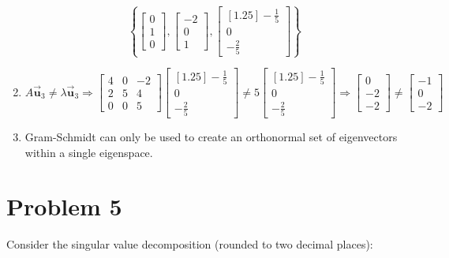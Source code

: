 \documentclass[letter,11pt]{article}
\theoremstyle{definition}
\newcommand{\uvec}{\vec{\boldsymbol{u}}}
\begin{document}
\begin{tcolorbox}[boxrule=1mm,enhanced jigsaw, breakable,before=\hfill,after=\hfill,adjusted title={Problem 4 solutions}]
\begin{enumerate}[label = \alph*.)]
            $$\left\{\begin{bmatrix}0\\ 1\\ 0 \end{bmatrix},\begin{bmatrix}-2\\ 0\\ 1 \end{bmatrix},\begin{bmatrix}[1.25]-\frac{1}{5}\\ 0\\ -\frac{2}{5} \end{bmatrix} \right\}$$
        \item 
        $$A\uvec_{3} \neq \lambda \uvec_{3}\Longrightarrow \begin{bmatrix}4 & 0 & -2 \\ 2 & 5 & 4 \\ 0 & 0 & 5\end{bmatrix}\begin{bmatrix}[1.25]-\frac{1}{5}\\ 0\\ -\frac{2}{5} \end{bmatrix} \neq 5 \begin{bmatrix}[1.25]-\frac{1}{5}\\ 0\\ -\frac{2}{5} \end{bmatrix} \Longrightarrow \begin{bmatrix}0\\ -2\\ -2 \end{bmatrix} \neq \begin{bmatrix}-1\\ 0\\ -2 \end{bmatrix}$$
        \item Gram-Schmidt can only be used to create an orthonormal set of eigenvectors within a single eigenspace. 
    \end{enumerate}
\end{tcolorbox}

\newpage
\section{Problem 5}
Consider the singular value decomposition (rounded to two decimal places):
\end{document}
